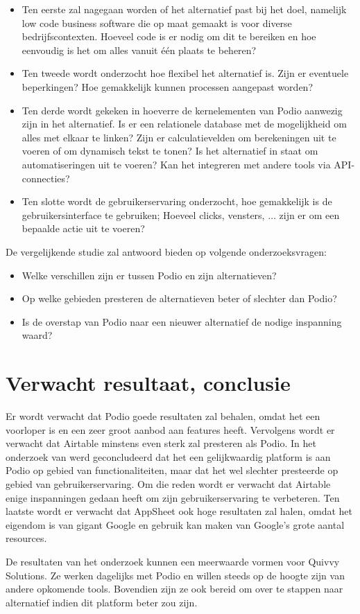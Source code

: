 \begin{itemize}
    \item Ten eerste zal nagegaan worden of het alternatief past bij het doel, namelijk low code business software die op maat gemaakt is voor diverse bedrijfscontexten. Hoeveel code is er nodig om dit te bereiken en hoe eenvoudig is het om alles vanuit één plaats te beheren?
    \item Ten tweede wordt onderzocht hoe flexibel het alternatief is. Zijn er eventuele beperkingen? Hoe gemakkelijk kunnen processen aangepast worden?
    \item Ten derde wordt gekeken in hoeverre de kernelementen van Podio aanwezig zijn in het alternatief. Is er een relationele database met de mogelijkheid om alles met elkaar te linken?  Zijn er calculatievelden om berekeningen uit te voeren of om dynamisch tekst te tonen? Is het alternatief in staat om automatiseringen uit te voeren? Kan het integreren met andere tools via API-connecties?
    \item Ten slotte wordt de gebruikerservaring onderzocht, hoe gemakkelijk is de gebruikersinterface te gebruiken; Hoeveel clicks, vensters, $\ldots$ zijn er om een bepaalde actie uit te voeren?
\end{itemize}

De vergelijkende studie zal antwoord bieden op volgende onderzoeksvragen:

\begin{itemize}
    \item Welke verschillen zijn er tussen Podio en zijn alternatieven?
    \item Op welke gebieden presteren de alternatieven beter of slechter dan Podio?
    \item Is de overstap van Podio naar een nieuwer alternatief de nodige inspanning waard?
\end{itemize}

\section{Verwacht resultaat, conclusie}%
\label{sec:verwachte_resultaten}

Er wordt verwacht dat Podio goede resultaten zal behalen, omdat het een voorloper is en een zeer groot aanbod aan features heeft. Vervolgens wordt er verwacht dat Airtable minstens even sterk zal presteren als Podio. In het onderzoek van \textcite{Spitaels2022} werd geconcludeerd dat het een gelijkwaardig platform is aan Podio op gebied van functionaliteiten, maar dat het wel slechter presteerde op gebied van gebruikerservaring. Om die reden wordt er verwacht dat Airtable enige inspanningen gedaan heeft om zijn gebruikerservaring te verbeteren. Ten laatste wordt er verwacht dat AppSheet ook hoge resultaten zal halen, omdat het eigendom is van gigant Google en gebruik kan maken van Google's grote aantal resources.

De resultaten van het onderzoek kunnen een meerwaarde vormen voor Quivvy Solutions. Ze werken dagelijks met Podio en willen steeds op de hoogte zijn van andere opkomende tools. Bovendien zijn ze ook bereid om over te stappen naar alternatief indien dit platform beter zou zijn.

